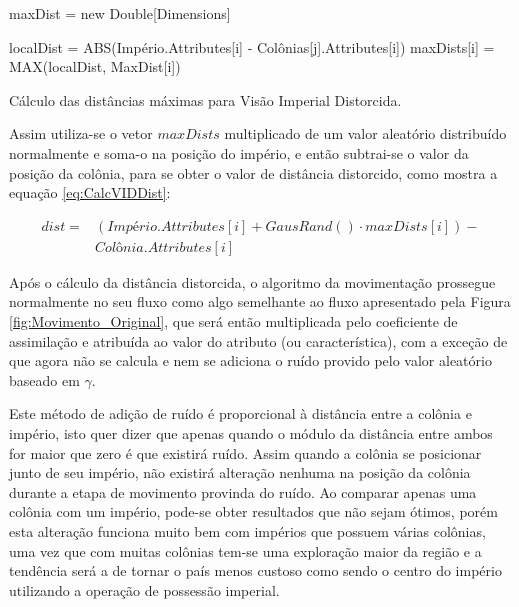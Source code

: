 \vspace{10px}
\begin{algorithm}[h]
\SetAlgoLined
{}
maxDist = new Double[Dimensions]\;

{
    {
    	localDist = ABS(Império.Attributes[i] - Colônias[j].Attributes[i])\;
        maxDists[i] = MAX(localDist, MaxDist[i])\;
    }
}
\caption{ Cálculo das distâncias máximas para Visão Imperial Distorcida.}
\label{alg:CalculoMaxDists}
\end{algorithm}

Assim utiliza-se o vetor \(maxDists\) multiplicado de um valor aleatório distribuído normalmente e soma-o na posição do império, e então subtrai-se o valor da posição da colônia, para se obter o valor de distância distorcido, como mostra a equação \ref{eq:CalcVIDDist}:

\begin{equation}
\label{eq:CalcVIDDist}
\begin{split}
dist = 
&(Império.Attributes[i] + GausRand() \cdot maxDists[i]) - \\ &Colônia.Attributes[i]
\end{split}
\end{equation}

Após o cálculo da distância distorcida, o algoritmo da movimentação prossegue normalmente no seu fluxo como algo semelhante ao fluxo apresentado pela Figura \ref{fig:Movimento_Original}, que será então multiplicada pelo coeficiente de assimilação e atribuída ao valor do atributo (ou característica), com a exceção de que agora não se calcula e nem se adiciona o ruído provido pelo valor aleatório baseado em \(\gamma\). 

Este método de adição de ruído é proporcional à distância entre a colônia e império, isto quer dizer que apenas quando o módulo da distância entre ambos for maior que zero é que existirá ruído. Assim quando a colônia se posicionar junto de seu império, não existirá alteração nenhuma na posição da colônia durante a etapa de movimento provinda do ruído. Ao comparar apenas uma colônia com um império, pode-se obter resultados que não sejam ótimos, porém esta alteração funciona muito bem com impérios que possuem várias colônias, uma vez que com muitas colônias tem-se uma exploração maior da região e a tendência será a de tornar o país menos custoso como sendo o centro do império utilizando a operação de possessão imperial.



